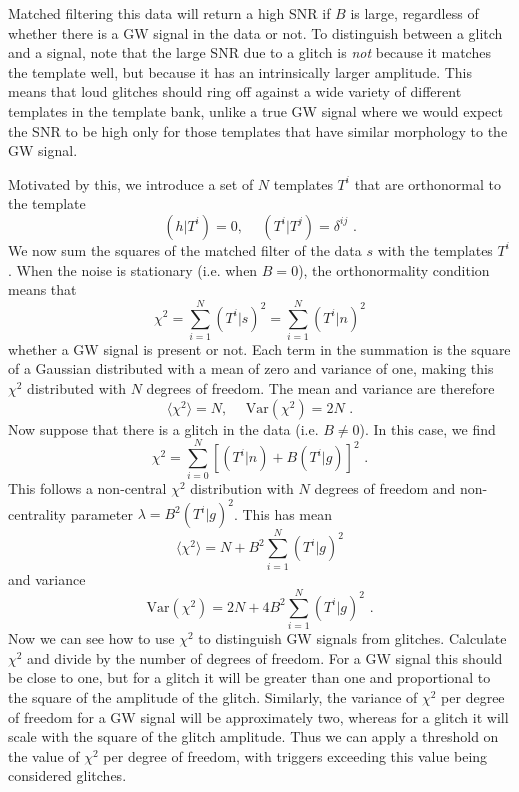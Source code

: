 \documentclass[11pt]{cuthesis}
\newcommand{\fs}{\text{ .}}
\begin{document}
Matched filtering this data will return a high SNR if $B$ is large, regardless of whether there is a GW signal in the data or not.  To distinguish between a glitch and a signal, note that the large SNR due to a glitch is \textit{not} because it matches the template well, but because it has an intrinsically larger amplitude. This means that loud glitches should ring off against a wide variety of different templates in the template bank, unlike a true GW signal where we would expect the SNR to be high only for those templates that have similar morphology to the GW signal. 

Motivated by this, we introduce a set of $N$ templates $T^i$ that are orthonormal to the template
\begin{equation}
(h|T^i) = 0, \hspace{15pt} (T^i|T^j) = \delta^{ij} \fs
\end{equation}
We now sum the squares of the matched filter of the data $s$ with the templates $T^i$. When the noise is stationary (i.e. when $B=0$), the orthonormality condition means that 
\begin{equation}
\chi^2 = \sum_{i=1}^N(T^i|s)^2 = \sum_{i=1}^N(T^i|n)^2
\end{equation} 
whether a GW signal is present or not. Each term in the summation is the square of a Gaussian distributed with a mean of zero and variance of one, making this $\chi^2$ distributed with $N$ degrees of freedom. The mean and variance are therefore
\begin{equation}
\langle \chi^2 \rangle = N, \hspace{15pt} \text{Var}(\chi^2) = 2N \fs
\end{equation}
Now suppose that there is a glitch in the data (i.e. $B \neq 0$). In this case, we find
\begin{equation}
\chi^2 = \sum_{i=0}^N [ (T^i|n) + B(T^i|g)]^2 \fs
\end{equation}
This follows a non-central $\chi^2$ distribution with $N$ degrees of freedom and non-centrality parameter $\lambda = B^2(T^i|g)^2$.
This has mean
\begin{equation}
\langle \chi^2 \rangle = N + B^2 \sum_{i=1}^N (T^i|g)^2
\end{equation}
and variance
\begin{equation}
\text{Var}(\chi^2) = 2N + 4B^2 \sum_{i=1}^N (T^i|g)^2\fs
\end{equation}
Now we can see how to use $\chi^2$ to distinguish GW signals from glitches. Calculate $\chi^2$ and divide by the number of degrees of freedom. For a GW signal this should be close to one, but for a glitch it will be greater than one and proportional to the square of the amplitude of the glitch. Similarly, the variance of $\chi^2$ per degree of freedom for a GW signal will be approximately two, whereas for a glitch it will scale with the square of the glitch amplitude. Thus we can apply a threshold on the value of $\chi^2$ per degree of freedom, with triggers exceeding this value being considered glitches. 
\end{document}
